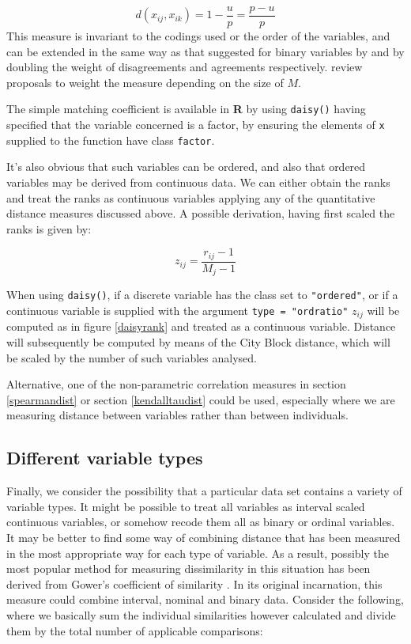 \begin{displaymath}
d(x_{ij},x_{ik}) = 1 - \frac{u}{p} = \frac{p-u}{p}
\end{displaymath}
This measure is invariant to the codings used or the order of the variables, and can be extended in the same way as that suggested for binary variables by \cite{Rogers+Tanomoto:1960} and \cite{Sokal+Sneath:1963} by doubling the weight of disagreements and agreements respectively.   \cite{Kaufman+Rousseeuw:1989} review proposals to weight the measure depending on the size of $M$.   

The simple matching coefficient is available in \textbf{R} by using \verb+daisy()+ having specified that the variable concerned is a factor, by ensuring the elements of \verb+x+ supplied to the function have class \verb+factor+.

It's also obvious that such variables can be ordered, and also that ordered variables may be derived from continuous data.   We can either obtain the ranks and treat the ranks as continuous variables applying any of the quantitative distance measures discussed above.   A possible derivation, having first scaled the ranks is given by:

\begin{displaymath}
\label{daisyrank}
z_{ij} = \frac{r_{ij} - 1}{M_{j} - 1}
\end{displaymath}

When using \verb+daisy()+, if a discrete variable has the class set to \verb+"ordered"+, or if a continuous variable is supplied with the argument \verb+type = "ordratio"+ $z_{ij}$ will be computed as in figure \ref{daisyrank} and treated as a continuous variable.   Distance will subsequently be computed by means of the City Block distance, which will be scaled by the number of such variables analysed.

Alternative, one of the non-parametric correlation measures in section \ref{spearmandist} or section \ref{kendalltaudist} could be used, especially where we are measuring distance between variables rather than between individuals.


\subsection{Different variable types}
\label{gowers}

Finally, we consider the possibility that a particular data set contains a variety of variable types.   It might be possible to treat all variables as interval scaled continuous variables, or somehow recode them all as binary or ordinal variables.  It may be better to find some way of combining distance that has been measured in the most appropriate way for each type of variable.  As a result, possibly the most popular method for measuring dissimilarity in this situation has been derived from Gower's coefficient of similarity \cite{Gower:1971}.   In its original incarnation, this measure could combine interval, nominal and binary data.   Consider the following, where we basically sum the individual similarities however calculated and divide them by the total number of applicable comparisons:

